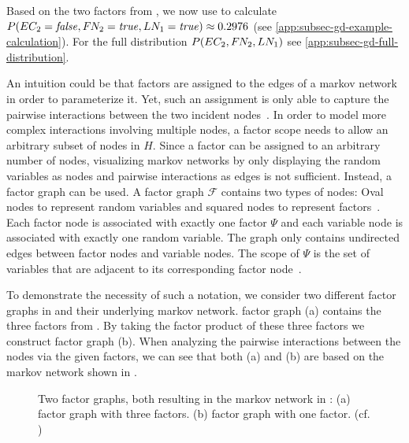 Based on the two \glspl{factor} from , we now use  to calculate $P(EC_2=\mathit{false},F\hspace{-0.07em} N_2=\mathit{true},LN_1=\mathit{true})\approx 0.2976$ (see \cref{app:subsec-gd-example-calculation}).
For the full distribution $P(EC_2,F\hspace{-0.07em} N_2,LN_1)$ see \cref{app:subsec-gd-full-distribution}.

\bigskip

An intuition could be that \glspl{factor} are assigned to the edges of a \gls{markov network} in order to parameterize it.
Yet, such an \gls{assignment} is only able to capture the pairwise interactions between the two incident nodes~\citep{koller2009probabilistic}.
In order to model more complex interactions involving multiple nodes, a \gls{factor scope} needs to allow an arbitrary subset of nodes in $H$.
Since a factor can be assigned to an arbitrary number of nodes, visualizing \glspl{markov network} by only displaying the random variables as nodes and pairwise interactions as edges is not sufficient.
Instead, a \gls{factor graph} can be used.
A \gls{factor graph} $\mathcal{F}$ contains two types of \glspl{node}: Oval \glspl{node} to represent \glspl{random variable} and squared \glspl{node} to represent \glspl{factor}~\citep{koller2009probabilistic}.
Each factor node is associated with exactly one \gls{factor} $\Psi$ and each variable node is associated with exactly one \gls{random variable}.
The graph only contains undirected edges between factor nodes and variable nodes.
The scope of $\Psi$ is the set of variables that are adjacent to its corresponding factor node~\citep{koller2009probabilistic}.

To demonstrate the necessity of such a notation, we consider two different \glspl{factor graph} in  and their underlying \gls{markov network}.
\Gls{factor graph} (a) contains the three factors from .
By taking the \gls{factor product} of these three \glspl{factor} we construct \gls{factor graph} (b).
When analyzing the pairwise interactions between the nodes via the given \glspl{factor}, we can see that both (a) and (b) are based on the \gls{markov network} shown in  .

\begin{figure}[t]
\centering
  
\caption[Two factor graphs resulting in the same Markov network]{%
  Two \glspl{factor graph}, both resulting in the \gls{markov network} in :
  (a) \Gls{factor graph} with three \glspl{factor}.
  (b) \Gls{factor graph} with one \gls{factor}.
  (cf. \citep{koller2009probabilistic})
}
\label{fig:example-factor-graphs}
\end{figure}

